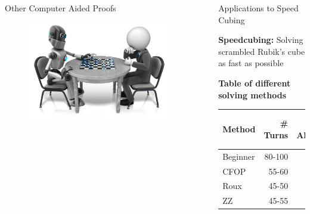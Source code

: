 \documentclass[final]{beamer}
\newlength{\sepwidth}
\newlength{\colwidth}
\newcommand{\separatorcolumn}{\begin{column}{\sepwidth}\end{column}}
\begin{document}
\begin{frame}[t]
\begin{columns}[t]
\begin{column}{\colwidth}
\begin{block}{Other Computer Aided Proofs}
    \begin{center}
      \begin{figure}
        \centering 
        \includegraphics[scale = 0.5]{logos/robot chess.jpeg}
      \end{figure}
    \end{center}


  \end{block}

\end{column}

\separatorcolumn

\begin{column}{\colwidth}

  \begin{block}{Applications to Speed Cubing}


    \large \textbf{Speedcubing:} Solving scrambled Rubik's cube as fast as possible

    \begin{center}
      \textbf{Table of different solving methods}
    \end{center}
    \begin{table}
      \centering
      \begin{tabular}{l r r c}
        \toprule
        \textbf{Method} & \textbf{\# Turns} & \textbf{\# Algorithms} & \textbf{Average Times (s)} \\
        \midrule
        Beginner & 80-100 & 15 & 30-120 \\
        CFOP & 55-60 & 78 & 5-30 \\
        Roux & 45-50 & 100+ & 5-20 \\
        ZZ & 45-55 & 493 & 5-15 \\
        \bottomrule
      \end{tabular}
    \end{table}



\end{block}
\end{column}
\end{columns}
\end{frame}
\end{document}
